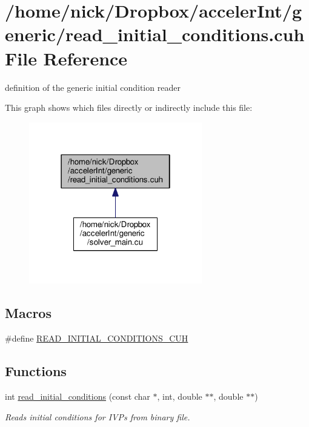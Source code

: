 \hypertarget{read__initial__conditions_8cuh}{}\section{/home/nick/\+Dropbox/acceler\+Int/generic/read\+\_\+initial\+\_\+conditions.cuh File Reference}
\label{read__initial__conditions_8cuh}


definition of the generic initial condition reader  


This graph shows which files directly or indirectly include this file\+:
\nopagebreak
\begin{figure}[H]
\begin{center}
\leavevmode
\includegraphics[width=214pt]{read__initial__conditions_8cuh__dep__incl}
\end{center}
\end{figure}
\subsection*{Macros}
\begin{DoxyCompactItemize}
\item 
\#define \hyperlink{read__initial__conditions_8cuh_aa94bd31760d037d12c0cfce818fa6ca4}{R\+E\+A\+D\+\_\+\+I\+N\+I\+T\+I\+A\+L\+\_\+\+C\+O\+N\+D\+I\+T\+I\+O\+N\+S\+\_\+\+C\+UH}
\end{DoxyCompactItemize}
\subsection*{Functions}
\begin{DoxyCompactItemize}
\item 
int \hyperlink{read__initial__conditions_8cuh_af316c999bd8f21073480df848cca5225}{read\+\_\+initial\+\_\+conditions} (const char $\ast$, int, double $\ast$$\ast$, double $\ast$$\ast$)
\begin{DoxyCompactList}\small\item\em Reads initial conditions for I\+V\+Ps from binary file. \end{DoxyCompactList}\end{DoxyCompactItemize}


